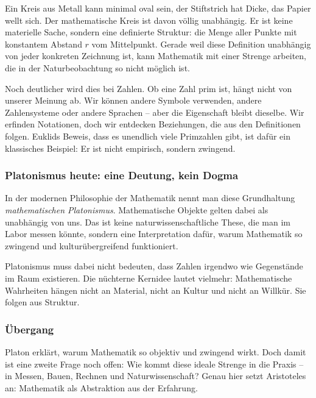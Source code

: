 Ein Kreis aus Metall kann minimal oval sein,
der Stiftstrich hat Dicke,
das Papier wellt sich.
Der mathematische Kreis ist davon völlig unabhängig.
Er ist keine materielle Sache,
sondern eine definierte Struktur:
die Menge aller Punkte mit konstantem Abstand \(r\) vom Mittelpunkt.
Gerade weil diese Definition unabhängig von jeder konkreten Zeichnung ist,
kann Mathematik mit einer Strenge arbeiten,
die in der Naturbeobachtung so nicht möglich ist.

Noch deutlicher wird dies bei Zahlen.
Ob eine Zahl prim ist,
hängt nicht von unserer Meinung ab.
Wir können andere Symbole verwenden,
andere Zahlensysteme oder andere Sprachen --
aber die Eigenschaft bleibt dieselbe.
Wir erfinden Notationen,
doch wir entdecken Beziehungen,
die aus den Definitionen folgen.
Euklids Beweis,
dass es unendlich viele Primzahlen gibt,
ist dafür ein klassisches Beispiel:
Er ist nicht empirisch,
sondern zwingend.

\subsubsection*{Platonismus heute: eine Deutung, kein Dogma}

In der modernen Philosophie der Mathematik nennt man diese Grundhaltung
\emph{mathematischen Platonismus}.
Mathematische Objekte gelten dabei als unabhängig von uns.
Das ist keine naturwissenschaftliche These,
die man im Labor messen könnte,
sondern eine Interpretation dafür,
warum Mathematik so zwingend und kulturübergreifend funktioniert.

Platonismus muss dabei nicht bedeuten,
dass Zahlen irgendwo wie Gegenstände im Raum existieren.
Die nüchterne Kernidee lautet vielmehr:
Mathematische Wahrheiten hängen nicht an Material,
nicht an Kultur
und nicht an Willkür.
Sie folgen aus Struktur.

\subsubsection*{Übergang}

Platon erklärt,
warum Mathematik so objektiv und zwingend wirkt.
Doch damit ist eine zweite Frage noch offen:
Wie kommt diese ideale Strenge in die Praxis --
in Messen,
Bauen,
Rechnen und Naturwissenschaft?
Genau hier setzt Aristoteles an:
Mathematik als Abstraktion aus der Erfahrung.


